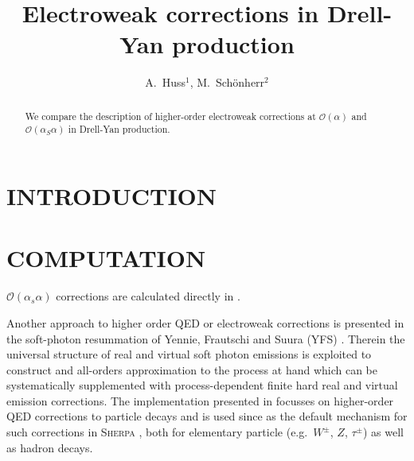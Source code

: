 \documentclass[11pt]{cernrep}
\newcommand{\order}{\mathcal{O}	}
\begin{document}
\title{Electroweak corrections in Drell-Yan production}

\author{
  A.\ Huss$^1$,
  M.\ Sch\"onherr$^2$
}

\maketitle

\begin{abstract}
  We compare the description of higher-order electroweak corrections at 
  $\order(\alpha)$ and $\order(\alpha_S\alpha)$ in Drell-Yan production.
\end{abstract}

\section{INTRODUCTION}
\label{sec:dyew:intro}



\section{COMPUTATION}
\label{sec:dyew:comp}


$\order(\alpha_s\alpha)$ corrections are calculated directly in \cite{}.

Another approach to higher order QED or electroweak corrections is 
presented in the soft-photon resummation of Yennie, Frautschi and 
Suura (YFS) \cite{Yennie:1961ad}. Therein the universal structure 
of real and virtual soft photon emissions is exploited to construct 
and all-orders approximation to the process at hand which can be 
systematically supplemented with process-dependent finite hard 
real and virtual emission corrections. The implementation presented 
in \cite{Schonherr:2008av} focusses on higher-order QED corrections 
to particle decays and is used since as the default mechanism for such 
corrections in \textsc{Sherpa} \cite{Gleisberg:2008ta}, both for 
elementary particle (e.g.\ $W^\pm$, $Z$, $\tau^\pm$) as well as 
hadron decays. 
\end{document}
